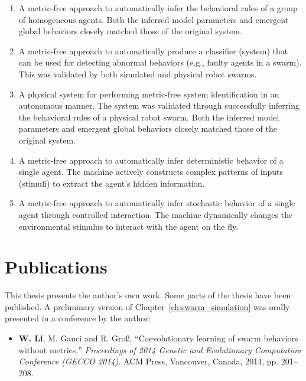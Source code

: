 \begin{enumerate}[1)]

\item A metric-free approach to automatically infer the behavioral rules of a group of homogeneous agents. Both the inferred model parameters and emergent global behaviors closely matched those of the original system. 

\item A metric-free approach to automatically produce a classifier (system) that can be used for detecting abnormal behaviors (e.g., faulty agents in a swarm). This was validated by both simulated and physical robot swarms.

\item A physical system for performing metric-free system identification in an autonomous manner. The system was validated through successfully inferring the behavioral rules of a physical robot swarm. Both the inferred model parameters and emergent global behaviors closely matched those of the original system. 

\item A metric-free approach to automatically infer deterministic behavior of a single agent. The machine actively constructs complex patterns of inputs (stimuli) to extract the agent's hidden information. 

\item A metric-free approach to automatically infer stochastic behavior of a single agent through controlled interaction. The machine dynamically changes the environmental stimulus to interact with the agent on the fly. 

\end{enumerate}

\section{Publications}

This thesis presents the author's own work. Some parts of the thesis have been published. A preliminary version of Chapter~\ref{ch:swarm_simulation} was orally presented in a conference by the author:
\begin{itemize}
%
\item \textbf{W. Li}, M. Gauci and R. Gro{\ss}, ``Coevolutionary learning of swarm behaviors without metrics,'' \textit{Proceedings of 2014 Genetic and Evolutionary Computation Conference (GECCO 2014)}. ACM Press, Vancouver, Canada, 2014, pp. 201--208.
%
\end{itemize}

